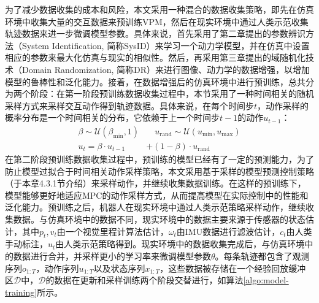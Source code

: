为了减少数据收集的成本和风险，本文采用一种混合的数据收集策略，即先在仿真环境中收集大量的交互数据来预训练VPM，然后在现实环境中通过人类示范收集轨迹数据来进一步微调模型参数。具体来说，首先采用了第二章提出的参数辨识方法（System Identification, 简称SysID）来学习一个动力学模型，并在仿真中设置相应的参数来最大化仿真与现实的相似性。然后，再采用第三章提出的域随机化技术（Domain Randomization, 简称DR）来进行图像、动力学的数据增强，以增加模型的鲁棒性和泛化能力。接着，在数据增强后的仿真环境中进行预训练，总共分为两个阶段：在第一阶段预训练数据收集过程中，本节采用了一种时间相关的随机采样方式来采样交互动作得到轨迹数据。具体来说，在每个时间步$t$，动作采样的概率分布是一个时间相关的分布，它依赖于上一个时间步$t-1$的动作$u_{t-1}$：
\begin{equation}
\begin{aligned}
    \beta \sim \mathcal{U}(\beta_{\text{min}}, 1)  &\quad u_{\text{rand}} \sim \mathcal{U}(u_{\text{min}}, u_{\text{max}}) \\
    u_t = \beta \cdot  u_{t-1} & + (1-\beta) \cdot u_{\text{rand}}
\end{aligned}
\end{equation}
在第二阶段预训练数据收集过程中，预训练的模型已经有了一定的预测能力，为了防止模型过拟合于时间相关动作采样策略，本文采用基于采样的模型预测控制策略（于本章4.3.1节介绍）来采样动作，并继续收集数据训练。在这样的预训练下，模型能够更好地适应MPC的动作采样方式，从而提高模型在实际控制中的性能和泛化能力。预训练之后，机器人在现实环境中通过人类示范策略采样动作，继续收集数据。与仿真环境中的数据不同，现实环境中的数据主要来源于传感器的状态估计，其中$p_t, v_t$由一个视觉里程计算法估计，$\omega_t$由IMU数据进行滤波估计，$c_t$由人类手动标注，$u_t$由人类示范策略得到。现实环境中的数据收集完成后，与仿真环境中的数据进行合并，并采样更小的学习率来微调模型参数$\theta$。每条轨迹都包含了观测序列$o_{1:T}$，动作序列$u_{1:T}$以及状态序列$x_{1:T}$，这些数据被存储在一个经验回放缓冲区$\mathcal{D}$中，$\mathcal{D}$的数据在更新和采样训练两个阶段交替进行，如算法\ref{algo:model-training}所示。

